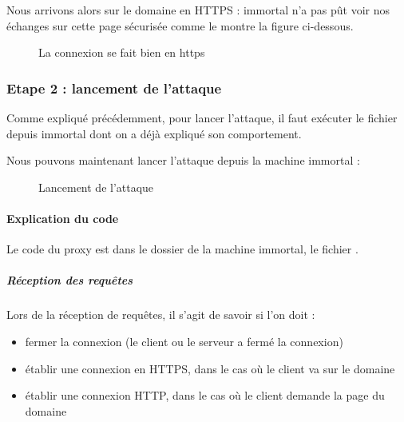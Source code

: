 Nous arrivons alors sur le domaine  en HTTPS : immortal n'a pas pût voir nos échanges sur cette page sécurisée comme le montre la figure ci-dessous.

\begin{figure}[H]
  \caption{La connexion se fait bien en https}
\end{figure}

\subsubsection{Etape 2 : lancement de l'attaque}

Comme expliqué précédemment, pour lancer l'attaque, il faut exécuter le fichier  depuis immortal dont on a déjà expliqué son comportement.

Nous pouvons maintenant lancer l'attaque depuis la machine immortal :


\begin{figure}[H]
  \caption{Lancement de l'attaque}
\end{figure}

\paragraph{Explication du code \\}

Le code du proxy est dans le dossier de la machine immortal, le fichier .

\subparagraph{Réception des requêtes \\}

Lors de la réception de requêtes, il s'agit de savoir si l'on doit :

\begin{itemize}
\item fermer la connexion (le client ou le serveur a fermé la connexion)
\item établir une connexion en HTTPS, dans le cas où le client va sur le domaine 
  \item établir une connexion HTTP, dans le cas où le client demande la page du domaine 
\end{itemize}

